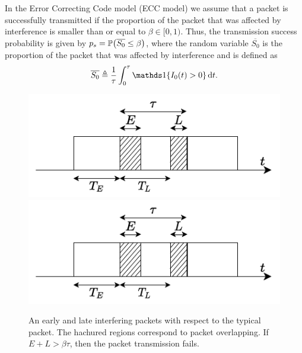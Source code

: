 In the Error Correcting Code model (ECC model) we assume that a packet is successfully transmitted if the proportion of the packet that was affected by interference is smaller than or equal to $\beta\in[0,1)$. %
%
Thus, the transmission success probability is given by $p_s = \P\!\left(\overline{S_0} \le \beta\right)$, where the random variable $\overline{S_0}$ is the proportion of the packet that was affected by interference and is defined as
\begin{align}\label{eq:ECC_I}
    \overline{S_0} \triangleq \frac{1}{\tau}\int_0^\tau \ind\{I_0(t) > 0\}\,\d t.
\end{align}
%
\begin{figure}[htb]
    \centering
    \if{}
        \includegraphics{Figures/Ch5_PacketsRandomChannel.pdf}
    \else
        \includegraphics[draft]{Figures/Ch5_PacketsRandomChannel.pdf}
    \fi
    \caption{An early and late interfering packets with respect to the typical packet. The hachured regions correspond to packet overlapping. If $E+L>\beta\tau$, then the packet transmission fails.}
    \label{fig:P2_diagram_ECC}
\end{figure}%

~\\

